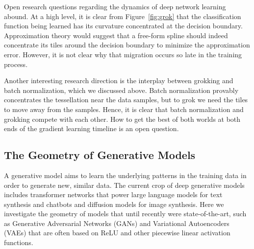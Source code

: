 \documentclass{notices}
\begin{document}
Open research questions regarding the dynamics of deep network learning abound.
At a high level, it is clear from Figure~\ref{fig:grok} that the classification function being learned has its curvature concentrated at the decision boundary.
Approximation theory would suggest that a free-form spline should indeed concentrate its tiles around the decision boundary to minimize the approximation error. 
However, it is not clear why that migration occurs so late in the training process.





Another interesting research direction is the interplay between grokking and batch normalization, which we discussed above. 
Batch normalization provably concentrates the tessellation near the data samples, but to grok we need the tiles to move away from the samples.
Hence, it is clear that batch normalization and grokking compete with each other. 
How to get the best of both worlds at both ends of the gradient learning timeline is an open question.






\subsection*{The Geometry of Generative Models}

A generative model aims to learn the underlying patterns in the training data in order to generate new, similar data. 
The current crop of deep generative models includes transformer networks that power large language models for text synthesis and chatbots and diffusion models for image synthesis.
Here we investigate the geometry of models that until recently were state-of-the-art, such as Generative Adversarial Networks (GANs) and Variational Autoencoders (VAEs) that are often based on ReLU and other piecewise linear activation functions.
\end{document}
